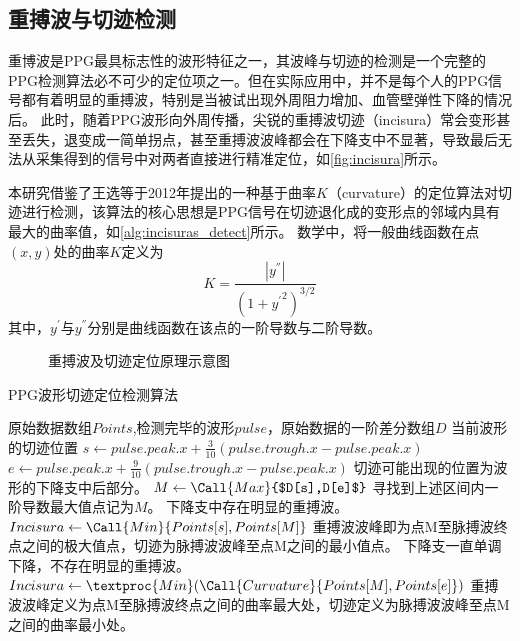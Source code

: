 \subsection{重搏波与切迹检测}
重博波是PPG最具标志性的波形特征之一，其波峰与切迹的检测是一个完整的PPG检测算法必不可少的定位项之一\cite{Wang2012}。但在实际应用中，并不是每个人的PPG信号都有着明显的重搏波，特别是当被试出现外周阻力增加、血管壁弹性下降的情况后\cite{mmt}。
此时，随着PPG波形向外周传播，尖锐的重搏波切迹（incisura）常会变形甚至丢失，退变成一简单拐点，甚至重搏波波峰都会在下降支中不显著，导致最后无法从采集得到的信号中对两者直接进行精准定位，如\autoref{fig:incisura}所示。

本研究借鉴了王选等\cite{Wang2012}于2012年提出的一种基于曲率$K$（curvature）的定位算法对切迹进行检测，该算法的核心思想是PPG信号在切迹退化成的变形点的邻域内具有最大的曲率值，如\autoref{alg:incisuras_detect}所示。
数学中，将一般曲线函数在点$(x,y)$处的曲率$K$定义为
\begin{equation}
    \label{equ:curvature}
    K=\frac{|y^{''}|}{{(1+{y^{'}}^2)}^{3/2}}
\end{equation}
其中，$y^{'}$与$y^{''}$分别是曲线函数在该点的一阶导数与二阶导数。

\begin{figure}[htbp]
    \centering
    \quad
    \caption[重搏波及切迹定位原理示意图]{\label{fig:incisura}重搏波及切迹定位原理示意图\cite{Wang2012,Su2014}}
\end{figure}

\begin{breakablealgorithm}
    \caption{PPG波形切迹定位检测算法}
    \label{alg:incisuras_detect}
    \begin{algorithmic}[1] %
        \Require 原始数据数组$Points$,检测完毕的波形$pulse$，原始数据的一阶差分数组$D$
        \Ensure 当前波形的切迹位置
            \State $s \gets pulse.peak.x + \frac{3}{10}(pulse.trough.x-pulse.peak.x)$
            \State $e \gets pulse.peak.x + \frac{9}{10}(pulse.trough.x-pulse.peak.x)$
            \State \Comment 切迹可能出现的位置为波形的下降支中后部分。
            \State $M  \gets \Call{Max}{$D[s],D[e]$}$
            \State \Comment 寻找到上述区间内一阶导数最大值点记为$M$。
                \State \Comment 下降支中存在明显的重搏波。
                \State $Incisura \gets \Call{Min}{Points[s],Points[M]}$
                \State \Comment 重搏波波峰即为点M至脉搏波终点之间的极大值点，切迹为脉搏波波峰至点M之间的最小值点。
            \Else
                \State \Comment 下降支一直单调下降，不存在明显的重搏波。
                \State $Incisura \gets \textproc{Min}({\Call{Curvature}{Points[M],Points[e]}})$
                \State \Comment 重搏波波峰定义为点M至脉搏波终点之间的曲率最大处，切迹定义为脉搏波波峰至点M之间的曲率最小处。
            \EndIf
            \State {}
        \EndFunction
    \end{algorithmic}
\end{breakablealgorithm}

